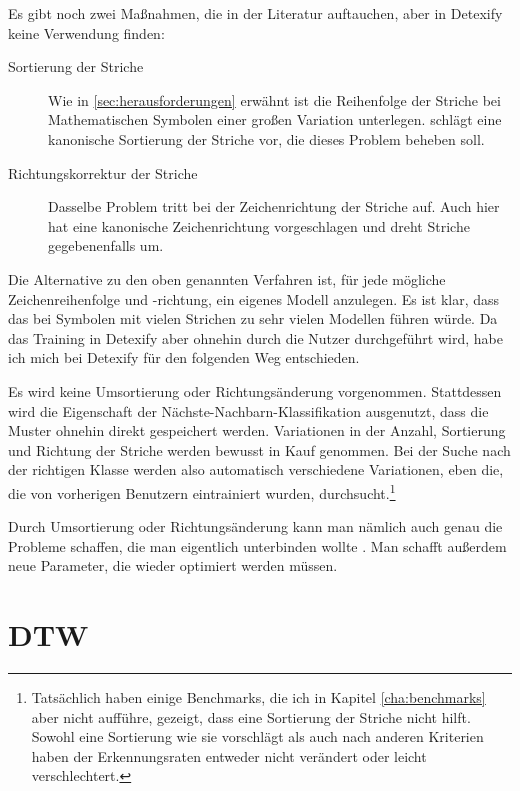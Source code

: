 Es gibt noch zwei Maßnahmen, die in der Literatur auftauchen, aber in Detexify keine Verwendung finden:

\begin{description}
  \item[Sortierung der Striche] Wie in \ref{sec:herausforderungen} erwähnt ist die Reihenfolge der Striche bei Mathematischen Symbolen einer großen Variation unterlegen. \citet{Matasakis:1999p9465} schlägt eine kanonische Sortierung der Striche vor, die dieses Problem beheben soll.
  \item[Richtungskorrektur der Striche] Dasselbe Problem tritt bei der Zeichenrichtung der Striche auf. Auch hier hat \citet{Matasakis:1999p9465} eine kanonische Zeichenrichtung vorgeschlagen und dreht Striche gegebenenfalls um.
\end{description}

Die Alternative zu den oben genannten Verfahren ist, für jede mögliche Zeichenreihenfolge und -richtung, ein eigenes Modell anzulegen. Es ist klar, dass das bei Symbolen mit vielen Strichen zu sehr vielen Modellen führen würde. Da das Training in Detexify aber ohnehin durch die Nutzer durchgeführt wird, habe ich mich bei Detexify für den folgenden Weg entschieden.

Es wird keine Umsortierung oder Richtungsänderung vorgenommen. Stattdessen wird die Eigenschaft der Nächste-Nachbarn-Klassifikation ausgenutzt, dass die Muster ohnehin direkt gespeichert werden. Variationen in der Anzahl, Sortierung und Richtung der Striche werden bewusst in Kauf genommen. Bei der Suche nach der richtigen Klasse werden also automatisch verschiedene Variationen, eben die, die von vorherigen Benutzern eintrainiert wurden, durchsucht.\footnote{Tatsächlich haben einige Benchmarks, die ich in Kapitel \ref{cha:benchmarks} aber nicht aufführe, gezeigt, dass eine Sortierung der Striche nicht hilft. Sowohl eine Sortierung wie \citet{Matasakis:1999p9465} sie vorschlägt als auch nach anderen Kriterien haben der Erkennungsraten entweder nicht verändert oder leicht verschlechtert.}

Durch Umsortierung oder Richtungsänderung kann man nämlich auch genau die Probleme schaffen, die man eigentlich unterbinden wollte \cite{Matasakis:1999p9465}. Man schafft außerdem neue Parameter, die wieder optimiert werden müssen.

\section{DTW} %
\label{sec:dtw}

